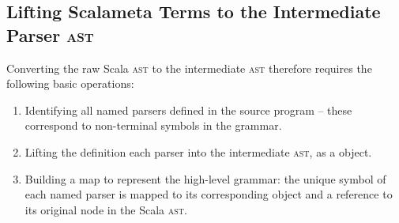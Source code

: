 \documentclass[../../main.tex]{subfiles}
\begin{document}
\subsection{Lifting Scalameta Terms to the Intermediate Parser \textsc{ast}}
Converting the raw Scala \textsc{ast} to the intermediate \textsc{ast} therefore requires the following basic operations:
\begin{enumerate}
  \item Identifying all named parsers defined in the source program -- these correspond to non-terminal symbols in the grammar.
  \item Lifting the definition each parser into the intermediate \textsc{ast}, as a  object.
  \item Building a map to represent the high-level grammar: the unique symbol of each named parser is mapped to its corresponding  object and a reference to its original node in the Scala \textsc{ast}.
\end{enumerate}
\end{document}
